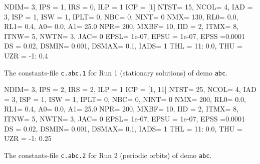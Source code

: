 \documentclass[12pt]{report}
\begin{document}
\begin{table}[htbp]
{\small
\begin{center}
\begin{boxedverbatim}
NDIM=   3, IPS =   1, IRS =   0, ILP =   1
ICP =  [1]
NTST=  15, NCOL=   4, IAD =   3, ISP =   1, ISW = 1, IPLT= 0, NBC= 0, NINT= 0
NMX=  130, RL0=   0.0, RL1=   0.4, A0=   0.0, A1=  25.0
NPR=  200, MXBF=  10, IID =   2, ITMX=   8, ITNW= 5, NWTN= 3, JAC= 0
EPSL= 1e-07, EPSU = 1e-07, EPSS =0.0001
DS  =  0.02, DSMIN= 0.001, DSMAX=   0.1, IADS=   1
THL =  {11: 0.0}, THU =  {}
UZR =  {-1: 0.4}
\end{boxedverbatim}
\end{center}
}
\caption{The constants-file {\tt c.abc.1} for Run 1 (stationary solutions)
of demo {\tt abc}.}
\label{tbl:demo_abcC1}
\end{table}


\begin{table}[htbp]
{\small
\begin{center}
\begin{boxedverbatim}
NDIM=   3, IPS =   2, IRS =   2, ILP =   1
ICP =  [1, 11]
NTST=  25, NCOL=   4, IAD =   3, ISP =   1, ISW = 1, IPLT= 0, NBC= 0, NINT= 0
NMX=  200, RL0=   0.0, RL1=   0.4, A0=   0.0, A1=  25.0
NPR=  200, MXBF=  10, IID =   2, ITMX=   8, ITNW= 5, NWTN= 3, JAC= 0
EPSL= 1e-07, EPSU = 1e-07, EPSS =0.0001
DS  =  0.02, DSMIN= 0.001, DSMAX=   0.1, IADS=   1
THL =  {11: 0.0}, THU =  {}
UZR =  {-1: 0.25}
\end{boxedverbatim}
\end{center}
}
\caption{The constants-file {\tt c.abc.2} for Run 2 (periodic orbits) 
of demo {\tt abc}.}
\label{tbl:demo_abcC2}
\end{table}
\end{document}
